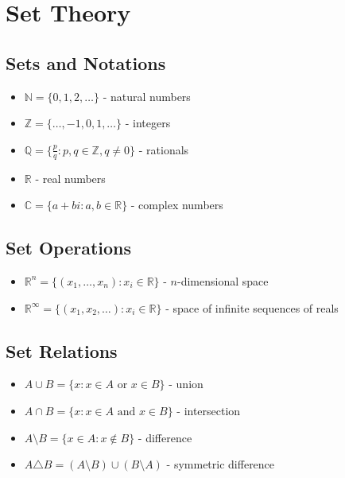 \documentclass[12pt,a4paper]{article}
\begin{document}
\section{Set Theory}

\subsection{Sets and Notations}

\begin{itemize}
    \item $\mathbb{N} = \{0,1,2,\ldots\}$ - natural numbers
    \item $\mathbb{Z} = \{\ldots,-1,0,1,\ldots\}$ - integers
    \item $\mathbb{Q} = \{\frac{p}{q} : p,q \in \mathbb{Z}, q \neq 0\}$ - rationals
    \item $\mathbb{R}$ - real numbers
    \item $\mathbb{C} = \{a+bi : a,b \in \mathbb{R}\}$ - complex numbers
\end{itemize}

\subsection{Set Operations}

\begin{itemize}
    \item $\mathbb{R}^n = \{(x_1,\ldots,x_n) : x_i \in \mathbb{R}\}$ - $n$-dimensional space
    \item $\mathbb{R}^\infty = \{(x_1,x_2,\ldots) : x_i \in \mathbb{R}\}$ - space of infinite sequences of reals
\end{itemize}

\subsection{Set Relations}

\begin{itemize}
    \item $A \cup B = \{x : x \in A \text{ or } x \in B\}$ - union
    \item $A \cap B = \{x : x \in A \text{ and } x \in B\}$ - intersection
    \item $A \setminus B = \{x \in A : x \notin B\}$ - difference
    \item $A \triangle B = (A \setminus B) \cup (B \setminus A)$ - symmetric difference
\end{itemize}
\end{document}
